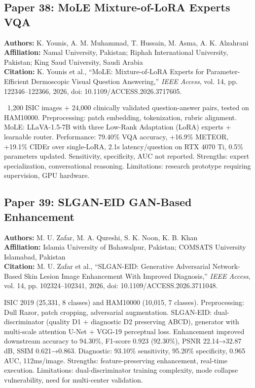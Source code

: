 \documentclass[conference]{IEEEtran}
\begin{document}
\subsection{Paper 38: MoLE Mixture-of-LoRA Experts VQA}

\noindent\textbf{Authors:} K. Younis, A. M. Muhammad, T. Hussain, M. Asma, A. K. Alzahrani\\
\textbf{Affiliation:} Namal University, Pakistan; Riphah International University, Pakistan; King Saud University, Saudi Arabia\\
\textbf{Citation:} K. Younis et al., ``MoLE: Mixture-of-LoRA Experts for Parameter-Efficient Dermoscopic Visual Question Answering,'' \textit{IEEE Access}, vol. 14, pp. 122346--122366, 2026, doi: 10.1109/ACCESS.2026.3717605.

~1,200 ISIC images + 24,000 clinically validated question-answer pairs, tested on HAM10000. Preprocessing: patch embedding, tokenization, rubric alignment. MoLE: LLaVA-1.5-7B with three Low-Rank Adaptation (LoRA) experts + learnable router. Performance: 79.40\% VQA accuracy, +16.9\% METEOR, +19.1\% CIDEr over single-LoRA, 2.1s latency/question on RTX 4070 Ti, 0.5\% parameters updated. Sensitivity, specificity, AUC not reported. Strengths: expert specialization, conversational reasoning. Limitations: research prototype requiring supervision, GPU hardware.

\subsection{Paper 39: SLGAN-EID GAN-Based Enhancement}

\noindent\textbf{Authors:} M. U. Zafar, M. A. Qureshi, S. K. Noon, K. B. Khan\\
\textbf{Affiliation:} Islamia University of Bahawalpur, Pakistan; COMSATS University Islamabad, Pakistan\\
\textbf{Citation:} M. U. Zafar et al., ``SLGAN-EID: Generative Adversarial Network-Based Skin Lesion Image Enhancement With Improved Diagnosis,'' \textit{IEEE Access}, vol. 14, pp. 102324--102341, 2026, doi: 10.1109/ACCESS.2026.3711048.

ISIC 2019 (25,331, 8 classes) and HAM10000 (10,015, 7 classes). Preprocessing: Dull Razor, patch cropping, adversarial augmentation. SLGAN-EID: dual-discriminator (quality D1 + diagnostic D2 preserving ABCD), generator with multi-scale attention U-Net + VGG-19 perceptual loss. Enhancement improved downstream accuracy to 94.30\%, F1-score 0.923 (92.30\%), PSNR 22.14→32.87 dB, SSIM 0.621→0.863. Diagnostic: 93.10\% sensitivity, 95.20\% specificity, 0.965 AUC, 112ms/image. Strengths: feature-preserving enhancement, real-time execution. Limitations: dual-discriminator training complexity, mode collapse vulnerability, need for multi-center validation.
\end{document}

